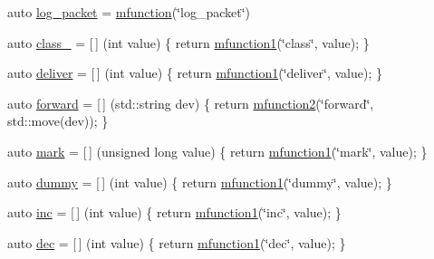 \begin{DoxyCompactItemize}
\item 
auto \hyperlink{namespacepfq__lang_1_1anonymous__namespace_02default_8hpp_03_a82a9b0e4c53eb28a98e5c34372a5b17b}{log\+\_\+packet} = \hyperlink{namespacepfq__lang_a47d60e7fc6df739692308276b8f6d4e4}{mfunction}(\char`\"{}log\+\_\+packet\char`\"{})
\item 
auto \hyperlink{namespacepfq__lang_1_1anonymous__namespace_02default_8hpp_03_a27a683ef93570a66844e1a0106e6336a}{class\+\_\+} = \mbox{[}$\,$\mbox{]} (int value) \{ return \hyperlink{namespacepfq__lang_a3cc9d61411c0398bb46aa2b33a21f7ed}{mfunction1}(\char`\"{}class\char`\"{}, value); \}
\item 
auto \hyperlink{namespacepfq__lang_1_1anonymous__namespace_02default_8hpp_03_a9baf04657b3da63a2a6d574bbcdafb76}{deliver} = \mbox{[}$\,$\mbox{]} (int value) \{ return \hyperlink{namespacepfq__lang_a3cc9d61411c0398bb46aa2b33a21f7ed}{mfunction1}(\char`\"{}deliver\char`\"{}, value); \}
\item 
auto \hyperlink{namespacepfq__lang_1_1anonymous__namespace_02default_8hpp_03_a7fbe4b2614dd240727bf1696b4d06523}{forward} = \mbox{[}$\,$\mbox{]} (std\+::string dev) \{ return \hyperlink{namespacepfq__lang_aa817867af6f06d681a8c1a6d3b3bdd50}{mfunction2}(\char`\"{}forward\char`\"{}, std\+::move(dev)); \}
\item 
auto \hyperlink{namespacepfq__lang_1_1anonymous__namespace_02default_8hpp_03_ad6142fe3a0fc859f25ea16956f52a5f0}{mark} = \mbox{[}$\,$\mbox{]} (unsigned long value) \{ return \hyperlink{namespacepfq__lang_a3cc9d61411c0398bb46aa2b33a21f7ed}{mfunction1}(\char`\"{}mark\char`\"{}, value); \}
\item 
auto \hyperlink{namespacepfq__lang_1_1anonymous__namespace_02default_8hpp_03_a876b4be1c6cf97e317f74242d8fb3da4}{dummy} = \mbox{[}$\,$\mbox{]} (int value) \{ return \hyperlink{namespacepfq__lang_a3cc9d61411c0398bb46aa2b33a21f7ed}{mfunction1}(\char`\"{}dummy\char`\"{}, value); \}
\item 
auto \hyperlink{namespacepfq__lang_1_1anonymous__namespace_02default_8hpp_03_a14246183085ec07f08ab9b0d53907ae5}{inc} = \mbox{[}$\,$\mbox{]} (int value) \{ return \hyperlink{namespacepfq__lang_a3cc9d61411c0398bb46aa2b33a21f7ed}{mfunction1}(\char`\"{}inc\char`\"{}, value); \}
\item 
auto \hyperlink{namespacepfq__lang_1_1anonymous__namespace_02default_8hpp_03_a6e71e558e459e950a4e9beeaaaf12cf6}{dec} = \mbox{[}$\,$\mbox{]} (int value) \{ return \hyperlink{namespacepfq__lang_a3cc9d61411c0398bb46aa2b33a21f7ed}{mfunction1}(\char`\"{}dec\char`\"{}, value); \}

\end{DoxyCompactItemize}
